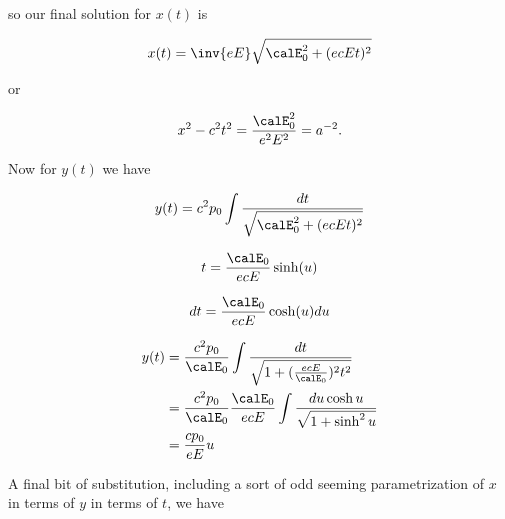 {so our final solution for \(x(t)\) is

\begin{equation}\label{eqn:relativisticElectrodynamicsT3:300}
x(t) = \inv{e E} \sqrt{ \calE_0^2 + (e c E t)^2 }
\end{equation}

or

\begin{equation}\label{eqn:relativisticElectrodynamicsT3:320}
x^2 - c^2 t^2 = \frac{\calE_0^2}{ e^2 E^2 } = a^{-2}.
\end{equation}

Now for \(y(t)\) we have

\begin{equation}\label{eqn:relativisticElectrodynamicsT3:340}
y(t) = c^2 p_0 \int \frac{dt}{ \sqrt{\calE_0^2 + (e c E t)^2 }}
\end{equation}

\begin{equation}\label{eqn:relativisticElectrodynamicsT3:360}
t = \frac{\calE_0}{ e c E} \sinh(u)
\end{equation}

\begin{equation}\label{eqn:relativisticElectrodynamicsT3:380}
dt = \frac{\calE_0}{ e c E} \cosh(u) du
\end{equation}

\begin{equation}\label{eqn:relativisticElectrodynamicsT3:970}
\begin{aligned}
y(t) 
&= \frac{c^2 p_0}{\calE_0} \int \frac{dt}{\sqrt{1 + (\frac{e c E}{\calE_0})^2 t^2 }} \\
&= \frac{c^2 p_0}{\calE_0} 
\frac{\calE_0}{ e c E} 
\int \frac{ du \cosh u }{\sqrt{1 + \sinh^2 u }} \\
&= \frac{c p_0}{ e E} u 
\end{aligned}
\end{equation}

A final bit of substitution, including a sort of odd seeming parametrization of \(x\) in terms of \(y\) in terms of \(t\), we have


}
